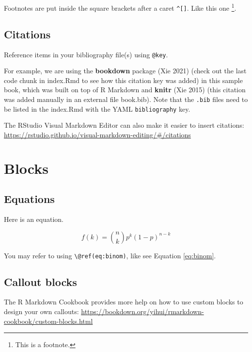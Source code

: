 \documentclass[12pt, oneside, openright]{byuthesis}
\begin{document}
Footnotes are put inside the square brackets after a caret \texttt{\^{}{[}{]}}. Like this one \footnote{This is a footnote.}.

\hypertarget{citations}{%
\section{Citations}\label{citations}}

Reference items in your bibliography file(s) using \texttt{@key}.

For example, we are using the \textbf{bookdown} package (Xie 2021) (check out the last code chunk in index.Rmd to see how this citation key was added) in this sample book, which was built on top of R Markdown and \textbf{knitr} (Xie 2015) (this citation was added manually in an external file book.bib).
Note that the \texttt{.bib} files need to be listed in the index.Rmd with the YAML \texttt{bibliography} key.

The RStudio Visual Markdown Editor can also make it easier to insert citations: \url{https://rstudio.github.io/visual-markdown-editing/\#/citations}

\hypertarget{blocks}{%
\chapter{Blocks}\label{blocks}}

\hypertarget{equations}{%
\section{Equations}\label{equations}}

Here is an equation.

\begin{equation} 
  f\left(k\right) = \binom{n}{k} p^k\left(1-p\right)^{n-k}
  \label{eq:binom}
\end{equation}

You may refer to using \texttt{\textbackslash{}@ref(eq:binom)}, like see Equation \eqref{eq:binom}.

\hypertarget{callout-blocks}{%
\section{Callout blocks}\label{callout-blocks}}

The R Markdown Cookbook provides more help on how to use custom blocks to design your own callouts: \url{https://bookdown.org/yihui/rmarkdown-cookbook/custom-blocks.html}
\end{document}
